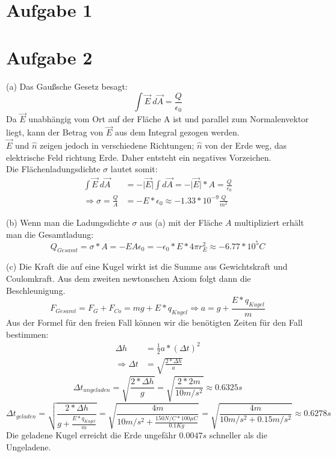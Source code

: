 \documentclass[a4paper]{article}
\newcommand{\epszero}{\epsilon_0}
\begin{document}
\thispagestyle{fancy}

\section*{Aufgabe 1}
\section*{Aufgabe 2}
\par{(a)} 
Das Gaußsche Gesetz besagt:
\[ \int \vec{E} \  d\vec{A} = \frac{Q}{\epsilon_0} \]
Da $\vec{E}$ unabhängig vom Ort auf der Fläche A ist und parallel zum Normalenvektor liegt, kann der Betrag von $\vec{E}$ aus dem Integral gezogen werden.\\
$\vec{E}$ und $\hat{n}$ zeigen jedoch in verschiedene Richtungen; $\hat{n}$ von der Erde weg, das elektrische Feld richtung Erde. Daher entsteht ein negatives Vorzeichen.\\
Die Flächenladungsdichte $\sigma$ lautet somit:
\begin{align*}
	\int \vec E \ d\vec A &= -\vert \vec E \vert \int d\vec A = -\vert \vec E \vert * A = \frac{Q}{\epszero} \\
	\Rightarrow \sigma = \frac{Q}{A} &= -E*\epszero
	\approx -1.33 * 10^{-9} \frac{Q}{m^2}
\end{align*}

\par{(b)}
Wenn man die Ladungsdichte $\sigma$ aus (a) mit der Fläche $A$ multipliziert erhält man die Gesamtladung:
\[
	Q_{Gesamt} = \sigma * A = -EA\epszero = -\epszero * E * 4\pi r_E^2 
	\approx -6.77 * 10^5 C
\]

\par{(c)}
Die Kraft die auf eine Kugel wirkt ist die Summe aus Gewichtskraft und Coulomkraft. Aus dem zweiten newtonschen Axiom folgt dann die Beschleunigung.
\[
	F_{Gesamt} = F_G + F_{Co} = mg + E*q_{Kugel} \Rightarrow a = g + \frac{E*q_{Kugel}}{m} 
\]
Aus der Formel für den freien Fall können wir die benötigten Zeiten für den Fall bestimmen:
\begin{align*}
	\Delta h &= \frac{1}{2} a*(\Delta t)^2 \\
	\Rightarrow \Delta t &= \sqrt{\frac{2*\Delta h}{a}}
\end{align*}
\[ 
	\Delta t_{ungeladen} = \sqrt{\frac{2*\Delta h}{g}} = \sqrt{\frac{2*2m}{10m/s^2}} \approx 0.6325s
\]
\[
	\Delta t_{geladen} = \sqrt{\frac{2*\Delta h}{g + \frac{E*q_{Kugel}}{m} }}
	= \sqrt{\frac{4m}{10m/s^2 + \frac{150N/C * 100 \mu C}{0.1 Kg} }}
	= \sqrt{\frac{4m}{10m/s^2 + 0.15 m/s^2}} \approx 0.6278s
\]
Die geladene Kugel erreicht die Erde ungefähr $0.0047s$ schneller als die Ungeladene.
\end{document}
